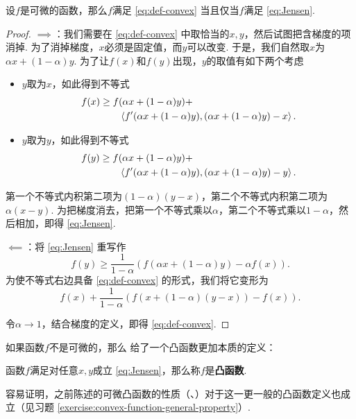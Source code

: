 \begin{theorem}\label{thm:convex-equivalence}
    设$f$是可微的函数，那么$f$满足 \eqref{eq:def-convex} 当且仅当$f$满足 \eqref{eq:Jensen}.
\end{theorem}
\begin{proof}
    $\implies$：我们需要在 \eqref{eq:def-convex} 中取恰当的$x,y$，然后试图把含梯度的项消掉. 为了消掉梯度，$x$必须是固定值，而$y$可以改变. 于是，我们自然取$x$为$\alpha x+(1-\alpha) y$. 为了让$f(x)$和$f(y)$出现，$y$的取值有如下两个考虑
    \begin{itemize}
        \item $y$取为$x$，如此得到不等式
        \begin{align*}
            f(x)&\geq f(\alpha x+(1-\alpha) y) + \\
            &\qquad\left\langle{f'(\alpha x+(1-\alpha) y)},{(\alpha x+(1-\alpha) y)-x}\right\rangle.
        \end{align*}

        \item $y$取为$y$，如此得到不等式
        \begin{align*}
            f(y)&\geq f(\alpha x+(1-\alpha) y) + \\
            &\qquad\left\langle{f'(\alpha x+(1-\alpha) y)},{(\alpha x+(1-\alpha) y)-y}\right\rangle.
        \end{align*}
    \end{itemize}

    第一个不等式内积第二项为$(1-\alpha)(y-x)$，第二个不等式内积第二项为$\alpha(x-y)$. 为把梯度消去，把第一个不等式乘以$\alpha$，第二个不等式乘以$1-\alpha$，然后相加，即得 \eqref{eq:Jensen}.

    $\impliedby$：将 \eqref{eq:Jensen} 重写作
    \[
    f(y)\geq\frac{1}{1-\alpha}(f(\alpha x+(1-\alpha) y)-\alpha f(x)).
    \]
    为使不等式右边具备 \eqref{eq:def-convex} 的形式，我们将它变形为
    \[f(x)+\frac{1}{1-\alpha}(f(x+(1-\alpha) (y-x))-f(x)).\]
    
    令$\alpha\to 1$，结合梯度的定义，即得 \eqref{eq:def-convex}.
\end{proof}

如果函数$f$不是可微的，那么 给了一个凸函数更加本质的定义：
\begin{definition}[凸函数]
    函数$f$满足对任意$x,y$成立 \eqref{eq:Jensen}，那么称$f$是\textbf{凸函数}.
\end{definition}

容易证明，之前陈述的可微凸函数的性质（、）对于这一更一般的凸函数定义也成立（见习题 \ref{exercise:convex-function-general-property}）.

